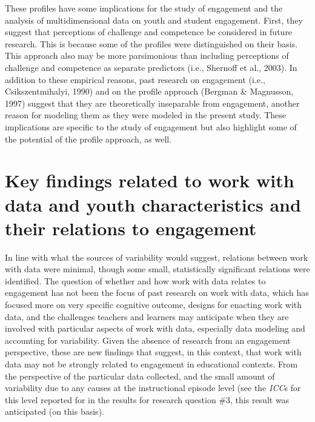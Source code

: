 \documentclass[]{book}
\theoremstyle{definition}
\theoremstyle{definition}
\theoremstyle{definition}
\theoremstyle{remark}
\begin{document}
These profiles have some implications for the study of engagement and
the analysis of multidimensional data on youth and student engagement.
First, they suggest that perceptions of challenge and competence be
considered in future research. This is because some of the profiles were
distinguished on their basis. This approach also may be more
parsimonious than including perceptions of challenge and competence as
separate predictors (i.e., Shernoff et al., 2003). In addition to these
empirical reasons, past research on engagement (i.e., Csikszentmihalyi,
1990) and on the profile approach (Bergman \& Magnusson, 1997) suggest
that they are theoretically inseparable from engagement, another reason
for modeling them as they were modeled in the present study. These
implications are specific to the study of engagement but also highlight
some of the potential of the profile approach, as well.

\section{Key findings related to work with data and youth
characteristics and their relations to
engagement}\label{key-findings-related-to-work-with-data-and-youth-characteristics-and-their-relations-to-engagement}

In line with what the sources of variability would suggest, relations
between work with data were minimal, though some small, statistically
significant relations were identified. The question of whether and how
work with data relates to engagement has not been the focus of past
research on work with data, which has focused more on very specific
cognitive outcome, designs for enacting work with data, and the
challenges teachers and learners may anticipate when they are involved
with particular aspects of work with data, especially data modeling and
accounting for variability. Given the absence of research from an
engagement perspective, these are new findings that suggest, in this
context, that work with data may not be strongly related to engagement
in educational contexts. From the perspective of the particular data
collected, and the small amount of variability due to any causes at the
instructional episode level (see the \emph{ICC}s for this level reported
for in the results for research question \#3, this result was
anticipated (on this basis).
\end{document}
